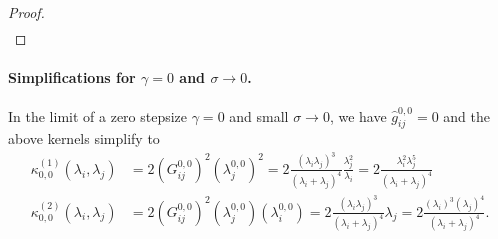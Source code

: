 \documentclass[11pt]{article}
\begin{document}
\begin{proof}
\begin{align}
\end{align}


\end{proof}
\paragraph{Simplifications for $\gamma=0$ and $\sigma \to 0$.} 
In the limit of a zero stepsize $\gamma = 0$ and small $\sigma \to 0$, we have $\hat g^{0, 0}_{ij} = 0$ and the above kernels simplify to 
\begin{align} \label{eq:kappa_simp}
   \kappa^{(1)}_{0, 0}(\lambda_i, \lambda_j) &= 2 ( G^{0, 0}_{ij})^2  (\lambda^{0, 0}_j)^2 = 2 \frac{ (\lambda_i \lambda_j)^3}{(\lambda_i + \lambda_j)^4} \frac{\lambda_j^2}{\lambda_i} = 2 \frac{ \lambda_i^2 \lambda_j^5}{(\lambda_i + \lambda_j)^4}  \\
   \kappa^{(2)}_{0, 0}(\lambda_i, \lambda_j) &=  2 ( G^{0, 0}_{ij})^2  (\lambda^{0, 0}_j) (\lambda^{0, 0}_i) = 2 \frac{ (\lambda_i \lambda_j)^3}{(\lambda_i + \lambda_j)^4} \lambda_j =
   2 \frac{ (\lambda_i)^3 (\lambda_j)^4}{(\lambda_i + \lambda_j)^4} .
\end{align}


 
\end{document}
